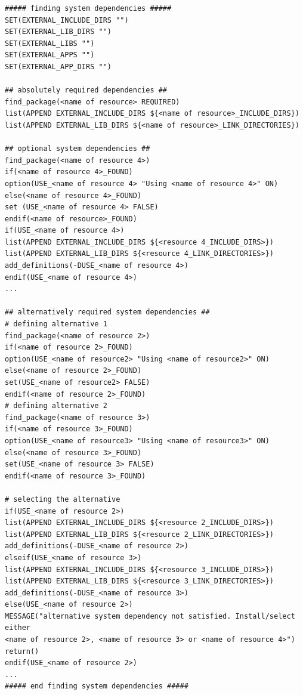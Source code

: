 \documentclass[12pt,a4paper]{article}
\begin{document}
\begin{verbatim}
##### finding system dependencies #####
SET(EXTERNAL_INCLUDE_DIRS "")
SET(EXTERNAL_LIB_DIRS "")
SET(EXTERNAL_LIBS "")
SET(EXTERNAL_APPS "")
SET(EXTERNAL_APP_DIRS "")

## absolutely required dependencies ##
find_package(<name of resource> REQUIRED)
list(APPEND EXTERNAL_INCLUDE_DIRS ${<name of resource>_INCLUDE_DIRS})
list(APPEND EXTERNAL_LIB_DIRS ${<name of resource>_LINK_DIRECTORIES})

## optional system dependencies ##
find_package(<name of resource 4>)
if(<name of resource 4>_FOUND)
option(USE_<name of resource 4> "Using <name of resource 4>" ON)
else(<name of resource 4>_FOUND)
set (USE_<name of resource 4> FALSE)
endif(<name of resource>_FOUND)
if(USE_<name of resource 4>)
list(APPEND EXTERNAL_INCLUDE_DIRS ${<resource 4_INCLUDE_DIRS>})
list(APPEND EXTERNAL_LIB_DIRS ${<resource 4_LINK_DIRECTORIES>})
add_definitions(-DUSE_<name of resource 4>)
endif(USE_<name of resource 4>)
...

## alternatively required system dependencies ##
# defining alternative 1
find_package(<name of resource 2>)
if(<name of resource 2>_FOUND)
option(USE_<name of resource2> "Using <name of resource2>" ON)
else(<name of resource 2>_FOUND)
set(USE_<name of resource2> FALSE)
endif(<name of resource 2>_FOUND)
# defining alternative 2
find_package(<name of resource 3>)
if(<name of resource 3>_FOUND)
option(USE_<name of resource3> "Using <name of resource3>" ON)
else(<name of resource 3>_FOUND)
set(USE_<name of resource 3> FALSE)
endif(<name of resource 3>_FOUND)

# selecting the alternative
if(USE_<name of resource 2>)
list(APPEND EXTERNAL_INCLUDE_DIRS ${<resource 2_INCLUDE_DIRS>})
list(APPEND EXTERNAL_LIB_DIRS ${<resource 2_LINK_DIRECTORIES>})
add_definitions(-DUSE_<name of resource 2>)
elseif(USE_<name of resource 3>)
list(APPEND EXTERNAL_INCLUDE_DIRS ${<resource 3_INCLUDE_DIRS>})
list(APPEND EXTERNAL_LIB_DIRS ${<resource 3_LINK_DIRECTORIES>})
add_definitions(-DUSE_<name of resource 3>)
else(USE_<name of resource 2>)
MESSAGE("alternative system dependency not satisfied. Install/select either 
<name of resource 2>, <name of resource 3> or <name of resource 4>")
return()
endif(USE_<name of resource 2>)
...
##### end finding system dependencies #####

\end{verbatim}
\end{document}
